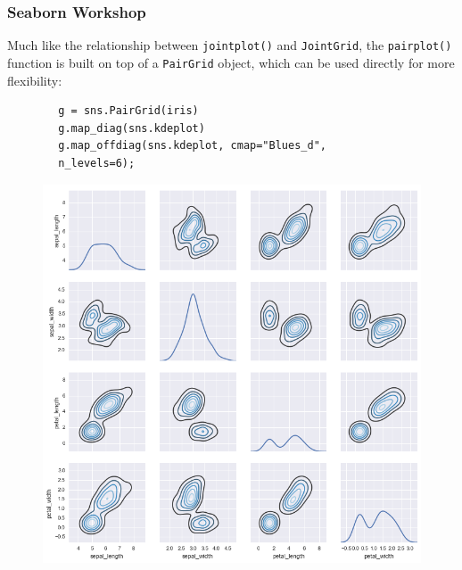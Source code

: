 \documentclass{beamer}
\begin{document}
\begin{frame}[fragile]
	\frametitle{Seaborn Workshop}
	\large
	Much like the relationship between \texttt{jointplot()} and \texttt{JointGrid}, the \texttt{pairplot()} function is built on top of a \texttt{PairGrid} object, which can be used directly for more flexibility:
	\begin{framed}
		\begin{verbatim}
		g = sns.PairGrid(iris)
		g.map_diag(sns.kdeplot)
		g.map_offdiag(sns.kdeplot, cmap="Blues_d", 
		n_levels=6);
		\end{verbatim}
	\end{framed}
\end{frame}
\begin{frame}[fragile]
	\begin{figure}
		\centering
		\includegraphics[width=0.7\linewidth]{images/distributions_44_1}
	\end{figure}
\end{frame}
\end{document}

